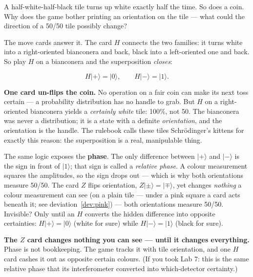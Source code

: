 \documentclass[a4paper,11pt]{article}
\providecommand{\ket}[1]{|#1\rangle}
\begin{document}
\begin{questionbox}
A half-white-half-black tile turns up white exactly half the time. So does a coin. Why
does the game bother printing an orientation on the tile --- what could the direction
of a 50/50 tile possibly change?
\end{questionbox}

The move cards answer it. The card $H$ connects the two families: it turns white into a
right-oriented bianconera and back, black into a left-oriented one and back. So play $H$
on a bianconera and the superposition \emph{closes}:

\begin{equation}
    H\ket{+} = \ket{0}, \qquad H\ket{-} = \ket{1}.
    \label{eq:hclose}
\end{equation}

\begin{shockbox}
\textbf{One card un-flips the coin.} No operation on a fair coin can make its next toss
certain --- a probability distribution has no handle to grab. But $H$ on a
right-oriented bianconera yields a \emph{certainly white} tile: 100\%, not 50. The
bianconera was never a distribution; it is a state with a definite \emph{orientation},
and the orientation is the handle. The rulebook calls these tiles Schr\"odinger's
kittens for exactly this reason: the superposition is a real, manipulable thing.
\end{shockbox}

The same logic exposes the \textbf{phase}. The only difference between $\ket{+}$
and $\ket{-}$ is the sign in front of $\ket{1}$; that sign is called a \emph{relative
phase}. A colour measurement squares the amplitudes, so the sign drops out --- which is
why both orientations measure 50/50. The card $Z$ flips orientation,
$Z\ket{\pm} = \ket{\mp}$, yet changes \emph{nothing} a colour measurement can see (on a plain tile --- under a pink square a card acts beneath it; see deviation~\ref{dev:pink}) ---
both orientations measure 50/50. Invisible? Only until an $H$ converts the hidden
difference into opposite certainties: $H\ket{+} = \ket{0}$ (white for sure) while
$H\ket{-} = \ket{1}$ (black for sure).

\begin{shockbox}
\textbf{The $Z$ card changes nothing you can see --- until it changes everything.}
Phase is not bookkeeping. The game tracks it with tile orientation, and one $H$ card
cashes it out as opposite certain colours. (If you took Lab 7: this is the same
relative phase that its interferometer converted into which-detector certainty.)
\end{shockbox}
\end{document}

